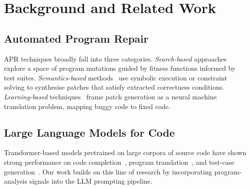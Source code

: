 \section{Background and Related Work}

\subsection{Automated Program Repair}

APR techniques broadly fall into three categories. \textit{Search-based}
approaches~\cite{le2015history} explore a space of program mutations guided by
fitness functions informed by test suites. \textit{Semantics-based}
methods~\cite{mechtaev2018semantic} use symbolic execution or constraint
solving to synthesise patches that satisfy extracted correctness conditions.
\textit{Learning-based} techniques~\cite{chen2019sequence} frame patch generation
as a neural machine translation problem, mapping buggy code to fixed code.

\subsection{Large Language Models for Code}

Transformer-based models pretrained on large corpora of source code have
shown strong performance on code completion~\cite{chen2021evaluating},
program translation~\cite{roziere2020unsupervised}, and test-case
generation~\cite{tufano2020unit}. Our work builds on this line of research by
incorporating program-analysis signals into the LLM prompting pipeline.

